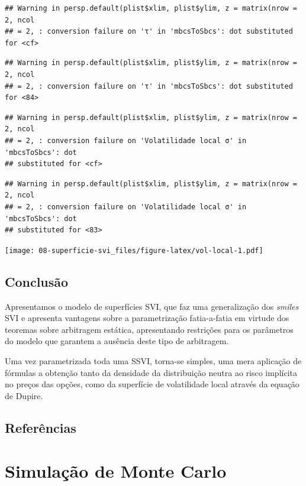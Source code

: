 \documentclass[]{book}
\theoremstyle{definition}
\theoremstyle{definition}
\theoremstyle{definition}
\theoremstyle{remark}
\begin{document}
\begin{verbatim}
## Warning in persp.default(plist$xlim, plist$ylim, z = matrix(nrow = 2, ncol
## = 2, : conversion failure on 'τ' in 'mbcsToSbcs': dot substituted for <cf>
\end{verbatim}

\begin{verbatim}
## Warning in persp.default(plist$xlim, plist$ylim, z = matrix(nrow = 2, ncol
## = 2, : conversion failure on 'τ' in 'mbcsToSbcs': dot substituted for <84>
\end{verbatim}

\begin{verbatim}
## Warning in persp.default(plist$xlim, plist$ylim, z = matrix(nrow = 2, ncol
## = 2, : conversion failure on 'Volatilidade local σ' in 'mbcsToSbcs': dot
## substituted for <cf>
\end{verbatim}

\begin{verbatim}
## Warning in persp.default(plist$xlim, plist$ylim, z = matrix(nrow = 2, ncol
## = 2, : conversion failure on 'Volatilidade local σ' in 'mbcsToSbcs': dot
## substituted for <83>
\end{verbatim}

\texttt{[image: 08-superficie-svi\_files/figure-latex/vol-local-1.pdf]}

\section{Conclusão}\label{conclusao-4}

Apresentamos o modelo de superfícies SVI, que faz uma generalização dos
\emph{smiles} SVI e apresenta vantagens sobre a parametrização
fatia-a-fatia em virtude dos teoremas sobre arbitragem estática,
apresentando restrições para os parâmetros do modelo que garantem a
ausência deste tipo de arbitragem.

Uma vez parametrizada toda uma SSVI, torna-se simples, uma mera
aplicação de fórmulas a obtenção tanto da densidade da distribuição
neutra ao risco implícita no preços das opções, como da superfície de
volatilidade local através da equação de Dupire.

\section{Referências}\label{referencias-1}

\hypertarget{monte-carlo}{\chapter{Simulação de Monte
Carlo}\label{monte-carlo}}
\end{document}
